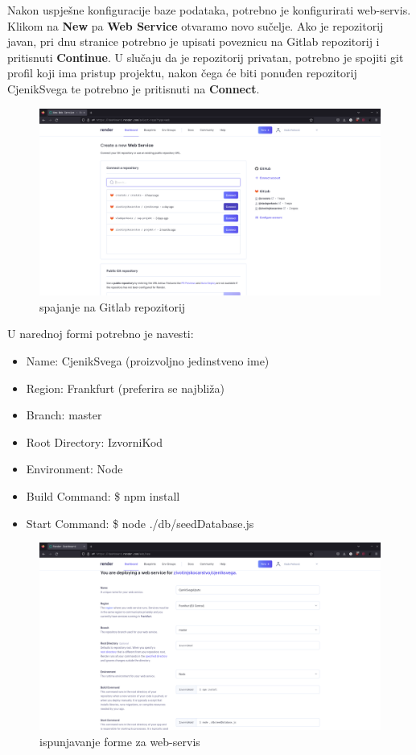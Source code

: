 			
			Nakon uspješne konfiguracije baze podataka, potrebno je konfigurirati web-servis. Klikom na \textbf{New} pa \textbf{Web Service} otvaramo novo sučelje. Ako je repozitorij javan, pri dnu stranice potrebno je upisati poveznicu na Gitlab repozitorij i pritisnuti \textbf{Continue}. U slučaju da je repozitorij privatan, potrebno je spojiti git profil koji ima pristup projektu, nakon čega će biti ponuđen repozitorij CjenikSvega te potrebno je pritisnuti na \textbf{Connect}.
			\begin{figure}[H]
			\includegraphics[width=\textwidth]{slike/connectweb.png} %
			\caption{spajanje na Gitlab repozitorij}
			\label{fig:gitlabConnect} %
			\end{figure}
			
			U narednoj formi potrebno je navesti: 
			\begin{itemize}
		\item Name: CjenikSvega (proizvoljno jedinstveno ime)
\item Region: Frankfurt (preferira se najbliža)
\item Branch: master
\item Root Directory: IzvorniKod
\item Environment: Node
\item Build Command: \$ npm install
\item Start Command: \$ node ./db/seedDatabase.js
		\end{itemize}
		\begin{figure}[H]
			\includegraphics[width=\textwidth]{slike/konfigws.png} %
			\caption{ispunjavanje forme za web-servis}
			\label{fig:webservis} %
			\end{figure}
			
